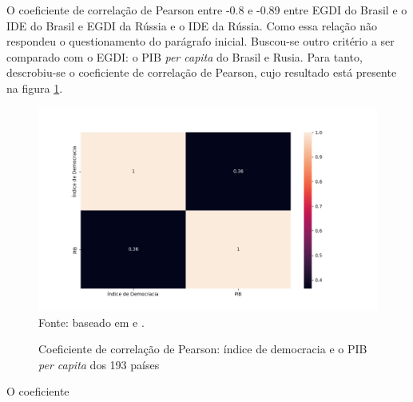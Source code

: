 O coeficiente de correlação de Pearson entre -0.8 e -0.89 entre EGDI do Brasil e o IDE do Brasil e EGDI da Rússia e o IDE da Rússia. Como essa relação não respondeu o questionamento do parágrafo inicial. Buscou-se outro critério a ser comparado com o EGDI: o PIB \textit{per capita} do Brasil e Rusia. Para tanto, descrobiu-se o coeficiente de correlação de Pearson, cujo resultado está presente na figura \ref{fig:correlacao4}.

\begin{figure}[H]
    \centering
    \caption{Coeficiente de correlação de Pearson: índice de democracia e o PIB \textit{per capita} dos 193 países}
    \includegraphics[width=1\linewidth]{figuras/egdi/correlacao4.png}
    \label{fig:correlacao4}
    \footnotesize{Fonte: baseado em \cite{ONU_edgi_mapa} e \cite{electoral_democracy_index}.}
\end{figure}

O coeficiente


